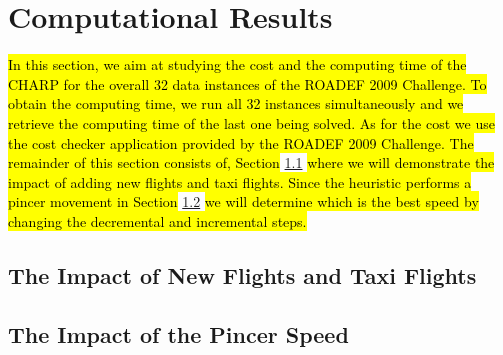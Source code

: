 \section{Computational Results}\label{sec:compResults}

\hl{In this section, we aim at studying the cost and the computing time of the CHARP for the overall 32 data instances of the ROADEF 2009 Challenge.  To obtain the computing time, we run all 32 instances simultaneously and we retrieve the computing time of the last one being solved. As for the cost we use the cost checker application provided by the ROADEF 2009 Challenge. The remainder of this section consists of, Section} \ref{sec:impact} \hl{ where we will demonstrate the impact of adding new flights and taxi flights. Since the heuristic performs a pincer movement in Section} \ref{sec:pincerSpeed} \hl{we will determine which is the best speed by changing the decremental and incremental steps.}\\
 


\subsection{The Impact of New Flights and Taxi Flights}\label{sec:impact}

  
\subsection{The Impact of the Pincer Speed}\label{sec:pincerSpeed}

 




